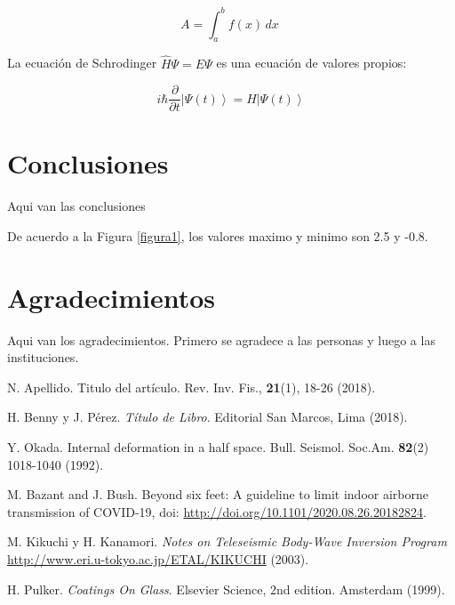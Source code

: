 \documentclass[a4paper,11pt]{article}
\begin{document}
\begin{equation}
\label{eq:4}
A=\int_{a}^{b} f(x)\,dx \   
\end{equation}

La ecuación de Schrodinger $\hat{H} \Psi = E \Psi $ es una ecuación de
valores propios:

\begin{equation}
i\hbar\frac{\partial}{\partial t}\left|\Psi(t)\right>=H\left|\Psi(t)\right>
\end{equation}

\section{Conclusiones}
Aqui van las conclusiones

De acuerdo a la Figura \ref{figura1}, los valores maximo y minimo son 2.5 y -0.8.

\section*{Agradecimientos}
Aqui van los agradecimientos. Primero se agradece a las personas y luego a las instituciones.

\begin{thebibliography}{99}
 N. Apellido. Titulo del artículo. Rev. Inv. Fis., \textbf{21}(1), 18-26 (2018).

 H. Benny y J. Pérez. \emph{Título de Libro}. Editorial San Marcos, Lima (2018).

 Y. Okada. Internal deformation in a half space. Bull. Seismol. Soc.Am. \textbf{82}(2) 1018-1040 (1992).

 M. Bazant and J. Bush. Beyond six feet: A guideline to limit indoor airborne transmission of COVID-19, doi: \url{http://doi.org/10.1101/2020.08.26.20182824}.

 M. Kikuchi y H. Kanamori. \emph{Notes on Teleseismic Body-Wave Inversion Program} \url{http://www.eri.u-tokyo.ac.jp/ETAL/KIKUCHI} (2003).

 H. Pulker. \emph{Coatings On Glass}. Elsevier Science, 2nd edition. Amsterdam (1999).

\end{thebibliography}
\end{document}
